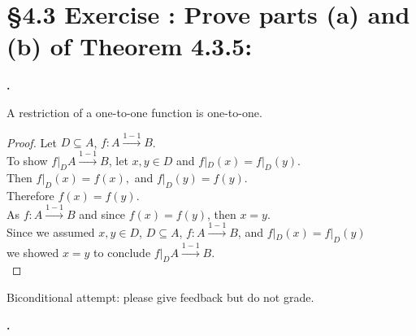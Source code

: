 \documentclass[a4paper,11pt]{article}
\begin{document}
\section*{\S 4.3 Exercise : Prove parts {(a)} and {(b)} of Theorem 4.3.5:}
\setcounter{SubsectionCounter}{1}
\textbf{.}
\begin{theorem1}
  A restriction of a one-to-one function is one-to-one.
  \begin{proof}
Let \(D \subseteq A\), \(f:A \xrightarrow{1-1} B\).\\
To show \(f|_{D} A \xrightarrow{1-1} B\), let \(x,y \in D\) and \(f|_{D}{(x)} = f|_{D}{(y)}\).\\
Then \(f|_{D}{(x)} = f{(x)}, \) and \(f|_{D}{(y)} = f{(y)}\).\\
Therefore \(f{(x)}=f{(y)}\).\\
As \(f:A \xrightarrow{1-1} B\) and since  \(f{(x)}=f{(y)}\), then \(x=y\).\\
Since we assumed \(x,y \in D\), \(D \subseteq A\), \(f: A \xrightarrow{1-1} B\), and  \(f|_{D}{(x)} = f|_{D}{(y)}\)\\ we showed 
\(x=y\) to conclude \(f|_{D} A \xrightarrow{1-1} B\).\\
  \end{proof}
  Biconditional attempt: please give feedback but do not grade.
\end{theorem1}
\newpage
\addtocounter{SubsectionCounter}{1}
\noindent\textbf{.}
\end{document}
